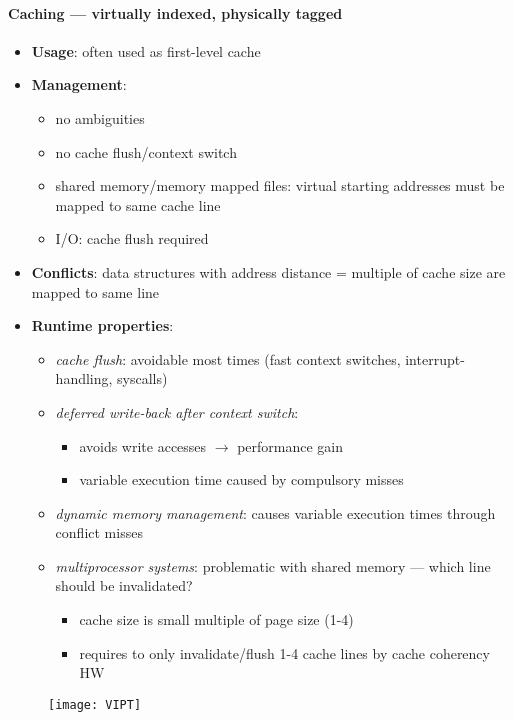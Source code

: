 \paragraph{Caching --- virtually indexed, physically tagged}
\begin{itemize}
  \item \textbf{Usage}: often used as first-level cache
  \item \textbf{Management}:
  \begin{itemize}
    \item no ambiguities
    \item no cache flush/context switch
    \item shared memory/memory mapped files: virtual starting addresses must be mapped to same cache line
    \item I/O: cache flush required
  \end{itemize}
  \item \textbf{Conflicts}: data structures with address distance = multiple of cache size are mapped to same line
  \item \textbf{Runtime properties}:
  \begin{itemize}
    \item \emph{cache flush}: avoidable most times (fast context switches, interrupt-handling, syscalls)
    \item \emph{deferred write-back after context switch}:
    \begin{itemize}
      \item avoids write accesses $ \to $ performance gain
      \item variable execution time caused by compulsory misses
    \end{itemize}
    \item \emph{dynamic memory management}: causes variable execution times through conflict misses
    \item \emph{multiprocessor systems}: problematic with shared memory --- which line should be invalidated?
    \begin{itemize}
      \item cache size is small multiple of page size (1-4)
      \item requires to only invalidate/flush 1-4 cache lines by cache coherency HW
    \end{itemize}
  \end{itemize}
\end{itemize}
\begin{figure}[h]\centering\label{VIPT}\texttt{[image: VIPT]}\end{figure}

